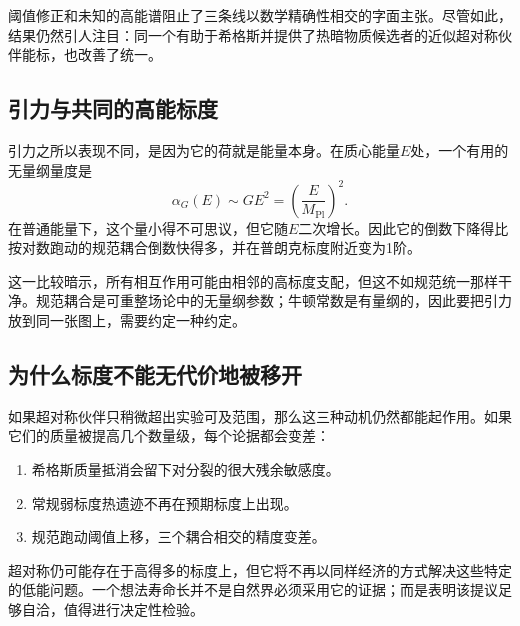 阈值修正和未知的高能谱阻止了三条线以数学精确性相交的字面主张。尽管如此，结果仍然引人注目：同一个有助于希格斯并提供了热暗物质候选者的近似超对称伙伴能标，也改善了统一。

\subsection{引力与共同的高能标度}

引力之所以表现不同，是因为它的荷就是能量本身。在质心能量\(E\)处，一个有用的无量纲量度是
\begin{equation}
\alpha_G(E)\sim GE^2
=\left(\frac{E}{M_{\mathrm{Pl}}}\right)^2.
\end{equation}
在普通能量下，这个量小得不可思议，但它随\(E\)二次增长。因此它的倒数下降得比按对数跑动的规范耦合倒数快得多，并在普朗克标度附近变为1阶。

这一比较暗示，所有相互作用可能由相邻的高标度支配，但这不如规范统一那样干净。规范耦合是可重整场论中的无量纲参数；牛顿常数是有量纲的，因此要把引力放到同一张图上，需要约定一种约定。

\begin{classroomqa}
\end{classroomqa}

\begin{classroomqa}
\end{classroomqa}

\subsection{为什么标度不能无代价地被移开}

如果超对称伙伴只稍微超出实验可及范围，那么这三种动机仍然都能起作用。如果它们的质量被提高几个数量级，每个论据都会变差：
\begin{enumerate}
\item 希格斯质量抵消会留下对分裂的很大残余敏感度。
\item 常规弱标度热遗迹不再在预期标度上出现。
\item 规范跑动阈值上移，三个耦合相交的精度变差。
\end{enumerate}
超对称仍可能存在于高得多的标度上，但它将不再以同样经济的方式解决这些特定的低能问题。一个想法寿命长并不是自然界必须采用它的证据；而是表明该提议足够自洽，值得进行决定性检验。

